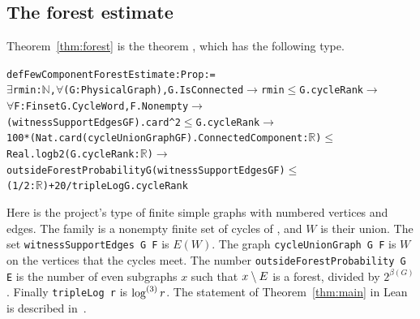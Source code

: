 \subsection{The forest estimate}

Theorem~\ref{thm:forest} is the theorem , which has the
following type.

{\small
\begin{alltt}
def FewComponentForestEstimate : Prop :=
  \(\exists\) rmin : \(\mathbb{N}\), \(\forall\) (G : PhysicalGraph), G.IsConnected \(\to\) rmin \(\le\) G.cycleRank \(\to\)
    \(\forall\) F : Finset G.CycleWord, F.Nonempty \(\to\)
      (witnessSupportEdges G F).card ^ 2 \(\le\) G.cycleRank \(\to\)
      100 * (Nat.card (cycleUnionGraph G F).ConnectedComponent : \(\mathbb{R}\)) \(\le\)
        Real.logb 2 (G.cycleRank : \(\mathbb{R}\)) \(\to\)
      outsideForestProbability G (witnessSupportEdges G F) \(\le\)
        (1 / 2 : \(\mathbb{R}\)) + 20 / tripleLog G.cycleRank
\end{alltt}}

Here  is the project's type of finite simple graphs with numbered vertices and
edges. The family  is a nonempty finite set of cycles of , and $W$ is their union.
The set \texttt{witnessSupportEdges G F} is $E(W)$. The graph \texttt{cycleUnionGraph G F} is $W$ on
the vertices that the cycles meet. The number \texttt{outsideForestProbability G E} is the number of
even subgraphs $x$ such that $x\setminus E$ is a forest, divided by $2^{\beta(G)}$. Finally
\texttt{tripleLog r} is $\log^{(3)}r$. The statement of Theorem~\ref{thm:main} in Lean is described
in~\cite[\S1.2]{KNT}.
